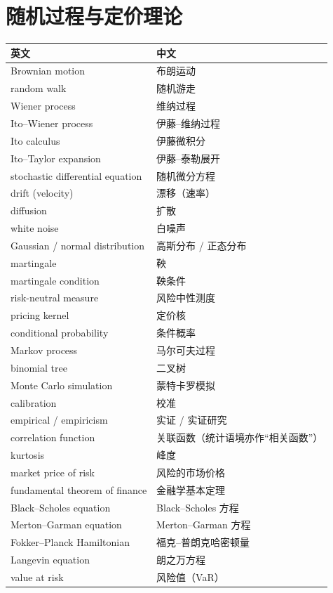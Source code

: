 \section{随机过程与定价理论}

\begin{center}
\begin{tabular}{@{}L{6.4cm}L{7.4cm}@{}}
\toprule
英文 & 中文 \\
\midrule
Brownian motion & 布朗运动 \\
random walk & 随机游走 \\
Wiener process & 维纳过程 \\
Ito--Wiener process & 伊藤--维纳过程 \\
Ito calculus & 伊藤微积分 \\
Ito--Taylor expansion & 伊藤--泰勒展开 \\
stochastic differential equation & 随机微分方程 \\
drift (velocity) & 漂移（速率） \\
diffusion & 扩散 \\
white noise & 白噪声 \\
Gaussian / normal distribution & 高斯分布 / 正态分布 \\
martingale & 鞅 \\
martingale condition & 鞅条件 \\
risk-neutral measure & 风险中性测度 \\
pricing kernel & 定价核 \\
conditional probability & 条件概率 \\
Markov process & 马尔可夫过程 \\
binomial tree & 二叉树 \\
Monte Carlo simulation & 蒙特卡罗模拟 \\
calibration & 校准 \\
empirical / empiricism & 实证 / 实证研究 \\
correlation function & 关联函数（统计语境亦作“相关函数”） \\
kurtosis & 峰度 \\
market price of risk & 风险的市场价格 \\
fundamental theorem of finance & 金融学基本定理 \\
Black--Scholes equation & Black--Scholes 方程 \\
Merton--Garman equation & Merton--Garman 方程 \\
Fokker--Planck Hamiltonian & 福克--普朗克哈密顿量 \\
Langevin equation & 朗之万方程 \\
value at risk & 风险值（VaR） \\
\bottomrule
\end{tabular}
\end{center}

